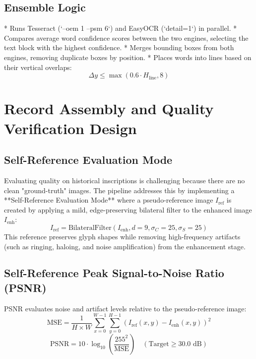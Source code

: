 \subsection{Ensemble Logic}
* Runs Tesseract (`--oem 1 --psm 6`) and EasyOCR (`detail=1`) in parallel.
* Compares average word confidence scores between the two engines, selecting the text block with the highest confidence.
* Merges bounding boxes from both engines, removing duplicate boxes by position.
* Places words into lines based on their vertical overlaps:
\begin{equation}
\Delta y \le \max\left(0.6 \cdot H_{\text{line}}, 8\right)
\end{equation}

\section{Record Assembly and Quality Verification Design}

\subsection{Self-Reference Evaluation Mode}
Evaluating quality on historical inscriptions is challenging because there are no clean "ground-truth" images. The pipeline addresses this by implementing a **Self-Reference Evaluation Mode** where a pseudo-reference image $I_{\text{ref}}$ is created by applying a mild, edge-preserving bilateral filter to the enhanced image $I_{\text{enh}}$:
\begin{equation}
I_{\text{ref}} = \text{BilateralFilter}(I_{\text{enh}}, d=9, \sigma_C=25, \sigma_S=25)
\end{equation}
This reference preserves glyph shapes while removing high-frequency artifacts (such as ringing, haloing, and noise amplification) from the enhancement stage.

\subsection{Self-Reference Peak Signal-to-Noise Ratio (PSNR)}
PSNR evaluates noise and artifact levels relative to the pseudo-reference image:
\begin{equation}
\text{MSE} = \frac{1}{H \times W} \sum_{x=0}^{W-1} \sum_{y=0}^{H-1} \left( I_{\text{ref}}(x, y) - I_{\text{enh}}(x, y) \right)^2
\end{equation}
\begin{equation}
\text{PSNR} = 10 \cdot \log_{10}\left( \frac{255^2}{\text{MSE}} \right) \quad (\text{Target} \ge 30.0\text{ dB})
\end{equation}

